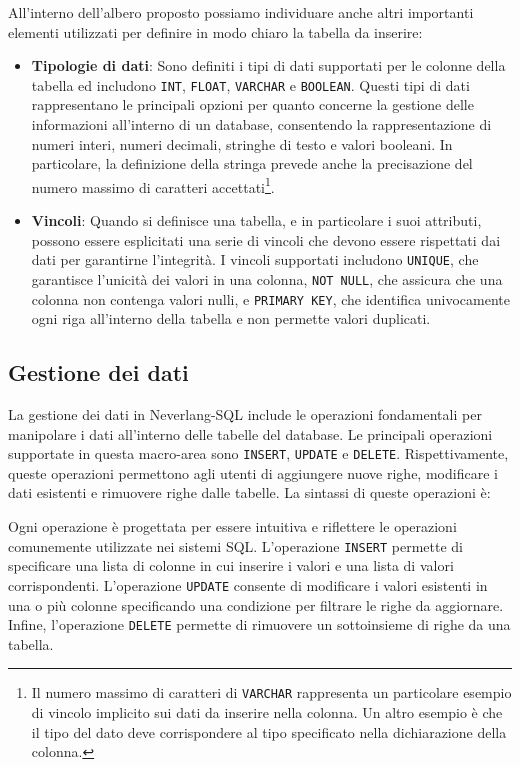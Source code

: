 \documentclass[12pt,a4paper,openright,twoside]{book}
\begin{document}
All’interno dell’albero proposto possiamo individuare anche altri importanti elementi utilizzati per definire in modo chiaro la 
tabella da inserire:
\begin{itemize}
    \item \textbf{Tipologie di dati}: Sono definiti i tipi di dati supportati per le colonne della tabella ed includono \texttt{INT}, 
    \texttt{FLOAT}, \texttt{VARCHAR} e \texttt{BOOLEAN}. Questi tipi di dati rappresentano le principali opzioni per quanto concerne 
    la gestione delle informazioni all’interno di un database, consentendo la rappresentazione di numeri interi, numeri decimali, 
    stringhe di testo e valori booleani. In particolare, la definizione della stringa prevede anche la precisazione del numero 
    massimo di caratteri accettati\footnote{Il numero massimo di caratteri di \texttt{VARCHAR} rappresenta un particolare esempio 
    di vincolo implicito sui dati da inserire nella colonna. Un altro esempio è che il tipo del dato deve corrispondere al tipo 
    specificato nella dichiarazione della colonna.}.
    \item \textbf{Vincoli}: Quando si definisce una tabella, e in particolare i suoi attributi, possono essere esplicitati una serie 
    di vincoli che devono essere rispettati dai dati per garantirne l’integrità. I vincoli supportati includono \texttt{UNIQUE}, 
    che garantisce l’unicità dei valori in una colonna, \texttt{NOT NULL}, che assicura che una colonna non contenga valori nulli, 
    e \texttt{PRIMARY KEY}, che identifica univocamente ogni riga all’interno della tabella e non permette valori duplicati.
\end{itemize}

\subsection{Gestione dei dati}
La gestione dei dati in Neverlang-SQL include le operazioni fondamentali per manipolare i dati all’interno delle tabelle del database. 
Le principali operazioni supportate in questa macro-area sono \texttt{INSERT}, \texttt{UPDATE} e \texttt{DELETE}. Rispettivamente, queste 
operazioni permettono agli utenti di aggiungere nuove righe, modificare i dati esistenti e rimuovere righe dalle tabelle. La 
sintassi di queste operazioni è:


Ogni operazione è progettata per essere intuitiva e riflettere le operazioni comunemente utilizzate nei sistemi SQL. L’operazione 
\texttt{INSERT} permette di specificare una lista di colonne in cui inserire i valori e una lista di valori corrispondenti. L’operazione 
\texttt{UPDATE} consente di modificare i valori esistenti in una o più colonne specificando una condizione per filtrare le righe da 
aggiornare. Infine, l’operazione \texttt{DELETE} permette di rimuovere un sottoinsieme di righe da una tabella.
\end{document}
